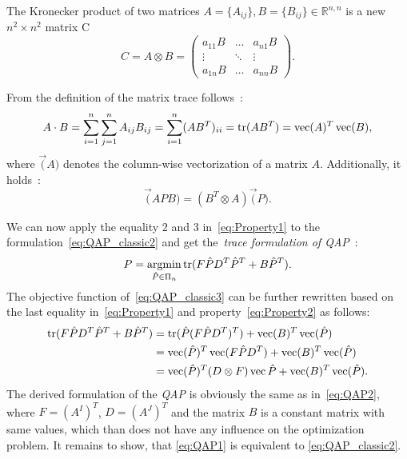 The Kronecker  product of two matrices $A=\{A_{ij}\},B=\{B_{ij}\}\in\mathbb{R}^{n,n}$ is a new $n^2\times n^2$ matrix C
\begin{equation}\label{eq:kronecker}
C=A\otimes B =  	
\begin{pmatrix} a_{11}B & \dots & a_{n1}B \\ \vdots & \ddots & \vdots \\ a_{1n}B & \dots & a_{nn}B  \end{pmatrix}.
\end{equation}

From the definition of the matrix trace follows~:
\begin{equation}\label{eq:Property1}
A\cdot B=\sum_{i=1}^{n}\sum_{j=1}^{n}A_{ij}B_{ij}=\sum_{i=1}^{n}(AB^T)_{ii}=\mathop{\rm tr}(AB^T)=\mathop{\rm vec}(A)^T\mathop{\rm vec}(B),
\end{equation}
where $\vec(A)$ denotes the column-wise vectorization of a matrix $A$. Additionally, it holds~:
\begin{equation}\label{eq:Property2}
\vec(APB)=(B^T\otimes A)\vec(P).
\end{equation}

We can now apply the equality $2$ and $3$ in~\eqref{eq:Property1} to the formulation~\eqref{eq:QAP_classic2} and get the~\emph{trace formulation of QAP}~\cite{Burkard98thequadratic}:
\begin{equation}\label{eq:QAP_classic3}
P = \mathop{\rm argmin}_{\hat{P}\in\Pi_n}\mathop{\rm tr}(F\hat{P}D^T\hat{P}^T+B\hat{P}^T).
\end{equation}
The objective function of~\eqref{eq:QAP_classic3} can be further rewritten based on the last equality in~\eqref{eq:Property1} and property~\eqref{eq:Property2} as follows:
 \begin{align}\label{eq:QAP_classic4}
\mathop{\rm tr}(F\hat{P}D^T\hat{P}^T+B\hat{P}^T)&=\mathop{\rm tr}(\hat{P}(F\hat{P}D^T)^T)+\mathop{\rm vec}(B)^T\mathop{\rm vec}(\hat{P}) \notag\\	
									&=\mathop{\rm vec}(\hat{P})^T\mathop{\rm vec}(F\hat{P}D^T)+\mathop{\rm vec}(B)^T\mathop{\rm vec}(\hat{P}) \notag\\	
                                    &=\mathop{\rm vec}(\hat{P})^T(D\otimes F)\mathop{\rm vec}{\hat{P}}+\mathop{\rm vec}(B)^T\mathop{\rm vec}(\hat{P}).
\end{align}
The derived formulation of the \emph{QAP} is obviously the same as in~\eqref{eq:QAP2}, where $F=(A^I)^T$, $D=(A^J)^T$ and the matrix $B$ is a constant matrix with same values, which than does not have any influence on the optimization problem. It remains to show, that \eqref{eq:QAP1} is equivalent to \eqref{eq:QAP_classic2}.

